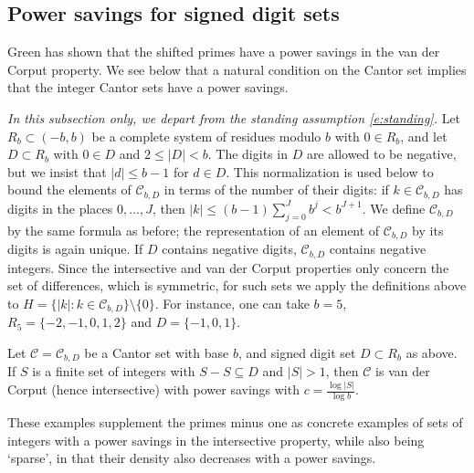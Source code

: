  
\subsection{Power savings for signed digit sets} \label{sub:signed}
Green \cite{green2023sarkozystheoremshiftedprimes} has shown that the shifted primes have a power savings in the van der Corput property.  
We see below that a natural condition on the Cantor set implies that the  integer Cantor sets 
have a power savings. 

\emph{In this subsection only, we depart from the standing assumption \eqref{e:standing}.} 
Let $R_b\subset (-b,b)$ be a complete system of residues modulo $b$ with $0\in R_b$, and let $D\subset R_b$ with $0\in D$ and $2\leq \lvert D\rvert<b$. 
The digits in $D$ are allowed to be negative, but we insist that $\lvert d\rvert\leq b-1$ for $d\in D$. 
This normalization is used below to bound the elements of $\mathcal C_{b,D}$ in terms of the number of their digits: 
if $k\in\mathcal C_{b,D}$ has digits in the places $0,\ldots ,J$, then $\lvert k\rvert \leq (b-1)\sum_{j=0}^{J} b ^{j} <b ^{J+1} $. 
We define $\mathcal C_{b,D}$ by the same formula as before; the representation of an element of $\mathcal C_{b,D}$ by its digits is again unique. 
If $D$ contains negative digits, $\mathcal C_{b,D}$ contains negative integers. 
Since the intersective and van der Corput properties only concern the set of differences, which is symmetric, 
for such sets we apply the definitions above to $H=\{\lvert k\rvert \colon k\in \mathcal C_{b,D}\}\setminus\{0\}$. 
For instance, one can take $b=5$, $R_5=\{-2,-1,0,1,2\}$ and $D=\{-1,0,1\}$. 

\begin{proposition}\label{Powersavings}  
Let $\mathcal{C} = \mathcal{C}_{b,D}$ be a Cantor set with base $b$, and signed digit set $D\subset R_b$ as above.  
If $S$ is a finite set of integers with $S-S \subseteq D$ and $\lvert S\rvert >1$, then 
$\mathcal{C}$ is  van der Corput (hence intersective) with  power savings with $c =  \frac{ \log \lvert S\rvert }{\log b} $. 
    \end{proposition}

These examples supplement the primes minus one as concrete examples of sets of integers with a power savings in the intersective property, while also being `sparse', in that their density also decreases with a power savings.  

